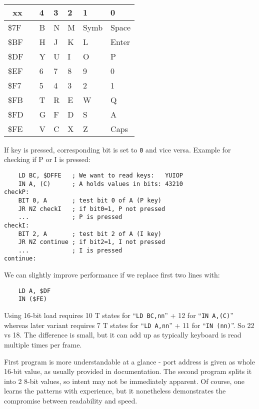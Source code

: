 \documentclass[12pt,twoside,openright,a4paper]{book}
\newcommand{\instrt}{\rule{0pt}{2.5ex}}
\newcommand{\instrb}{\rule[-1.4ex]{0pt}{0pt}}
\begin{document}
{
	\tt
	\setlength{\extrarowheight}{0pt}
	\def\arraystretch{0.1}
	
	\begin{tabular}{p{0.7cm}|cp{1cm}p{1cm}p{1cm}p{1.3cm}p{1.5cm}}

		~xx & & 4 & 3 & 2 & 1 & 0 \instrb \\
		\hline
		\$7F\instrt & & B & N & M & Symb & Space \\
		\$BF\instrt & & H & J & K & L & Enter \\
		\$DF\instrt & & Y & U & I & O & P \\
		\$EF\instrt & & 6 & 7 & 8 & 9 & 0 \\
		\$F7\instrt & & 5 & 4 & 3 & 2 & 1 \\
		\$FB\instrt & & T & R & E & W & Q \\
		\$FD\instrt & & G & F & D & S & A \\
		\$FE\instrt\instrb & & V & C & X & Z & Caps \\

	\end{tabular}
}

If key is pressed, corresponding bit is set to {\tt 0} and vice versa. Example for checking if P or I is pressed:
	
\begin{Verbatim}
	LD BC, $DFFE   ; We want to read keys:   YUIOP
	IN A, (C)      ; A holds values in bits: 43210
checkP:
	BIT 0, A       ; test bit 0 of A (P key)
	JR NZ checkI   ; if bit0=1, P not pressed
	...            ; P is pressed
checkI:
	BIT 2, A       ; test bit 2 of A (I key)
	JR NZ continue ; if bit2=1, I not pressed
	...            ; I is pressed
continue:
\end{Verbatim}

We can slightly improve performance if we replace first two lines with:

\begin{Verbatim}
	LD A, $DF
	IN ($FE)
\end{Verbatim}

Using 16-bit load requires 10 T states for ``{\tt LD BC,nn}'' + 12 for ``{\tt IN A,(C)}'' whereas later variant requires 7 T states for ``{\tt LD A,nn}'' + 11 for ``{\tt IN (nn)}''. So 22 vs 18. The difference is small, but it can add up as typically keyboard is read multiple times per frame.

First program is more understandable at a glance - port address is given as whole 16-bit value, as usually provided in documentation. The second program splits it into 2 8-bit values, so intent may not be immediately apparent. Of course, one learns the patterns with experience, but it nonetheless demonstrates the compromise between readability and speed.
\end{document}

